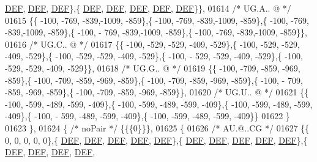 \begin{DoxyCode}
      \mbox{\hyperlink{1_88_84__epars_8h_a397419fc12b37ed479c8abb9d444d843}{DEF}},  \mbox{\hyperlink{1_88_84__epars_8h_a397419fc12b37ed479c8abb9d444d843}{DEF}},  \mbox{\hyperlink{1_88_84__epars_8h_a397419fc12b37ed479c8abb9d444d843}{DEF}}\},\{  \mbox{\hyperlink{1_88_84__epars_8h_a397419fc12b37ed479c8abb9d444d843}{DEF}},  \mbox{\hyperlink{1_88_84__epars_8h_a397419fc12b37ed479c8abb9d444d843}{DEF}},  \mbox{\hyperlink{1_88_84__epars_8h_a397419fc12b37ed479c8abb9d444d843}{DEF}},  \mbox{\hyperlink{1_88_84__epars_8h_a397419fc12b37ed479c8abb9d444d843}{DEF}},  \mbox{\hyperlink{1_88_84__epars_8h_a397419fc12b37ed479c8abb9d444d843}{DEF}}\}\},
01614 \textcolor{comment}{/* UG.A.. @ */}
01615 \{\{ -100, -769, -839,-1009, -859\},\{ -100, -769, -839,-1009, -859\},\{ -100, -769, -839,-1009, -859\},\{ -100, -
      769, -839,-1009, -859\},\{ -100, -769, -839,-1009, -859\}\},
01616 \textcolor{comment}{/* UG.C.. @ */}
01617 \{\{ -100, -529, -529, -409, -529\},\{ -100, -529, -529, -409, -529\},\{ -100, -529, -529, -409, -529\},\{ -100, -
      529, -529, -409, -529\},\{ -100, -529, -529, -409, -529\}\},
01618 \textcolor{comment}{/* UG.G.. @ */}
01619 \{\{ -100, -709, -859, -969, -859\},\{ -100, -709, -859, -969, -859\},\{ -100, -709, -859, -969, -859\},\{ -100, -
      709, -859, -969, -859\},\{ -100, -709, -859, -969, -859\}\},
01620 \textcolor{comment}{/* UG.U.. @ */}
01621 \{\{ -100, -599, -489, -599, -409\},\{ -100, -599, -489, -599, -409\},\{ -100, -599, -489, -599, -409\},\{ -100, -
      599, -489, -599, -409\},\{ -100, -599, -489, -599, -409\}\}
01622 \}
01623 \},
01624 \{ \textcolor{comment}{/* noPair */} \{\{\{0\}\}\},
01625 \{
01626 \textcolor{comment}{/* AU.@..CG */}
01627 \{\{    0,    0,    0,    0,    0\},\{  \mbox{\hyperlink{1_88_84__epars_8h_a397419fc12b37ed479c8abb9d444d843}{DEF}},  \mbox{\hyperlink{1_88_84__epars_8h_a397419fc12b37ed479c8abb9d444d843}{DEF}},  \mbox{\hyperlink{1_88_84__epars_8h_a397419fc12b37ed479c8abb9d444d843}{DEF}},  \mbox{\hyperlink{1_88_84__epars_8h_a397419fc12b37ed479c8abb9d444d843}{DEF}},  \mbox{\hyperlink{1_88_84__epars_8h_a397419fc12b37ed479c8abb9d444d843}{DEF}}\},\{  
      \mbox{\hyperlink{1_88_84__epars_8h_a397419fc12b37ed479c8abb9d444d843}{DEF}},  \mbox{\hyperlink{1_88_84__epars_8h_a397419fc12b37ed479c8abb9d444d843}{DEF}},  \mbox{\hyperlink{1_88_84__epars_8h_a397419fc12b37ed479c8abb9d444d843}{DEF}},  \mbox{\hyperlink{1_88_84__epars_8h_a397419fc12b37ed479c8abb9d444d843}{DEF}},  \mbox{\hyperlink{1_88_84__epars_8h_a397419fc12b37ed479c8abb9d444d843}{DEF}}\},\{  \mbox{\hyperlink{1_88_84__epars_8h_a397419fc12b37ed479c8abb9d444d843}{DEF}},  \mbox{\hyperlink{1_88_84__epars_8h_a397419fc12b37ed479c8abb9d444d843}{DEF}},  \mbox{\hyperlink{1_88_84__epars_8h_a397419fc12b37ed479c8abb9d444d843}{DEF}},  \mbox{\hyperlink{1_88_84__epars_8h_a397419fc12b37ed479c8abb9d444d843}{DEF}},  

\end{DoxyCode}
